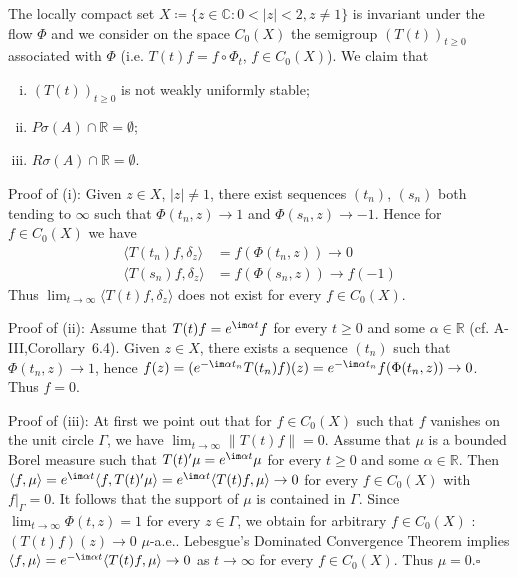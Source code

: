 \begin{example}
\begin{enumerate}[(a), wide, labelsep=1em, itemindent=\parindent]
The locally compact set $X \coloneq
 \{z \in \mathbb{C} \colon 0  <  |z|  <  2, z \neq 1\}$ is invariant under the flow $\Phi$ and we consider on the space $C_{0}(X)$ the semigroup $(T(t))_{t \geq 0}$ associated with $\Phi$ (i.e. $T(t)f = f\circ\Phi_t$, $f \in C_{0}(X)$). We claim that
\begin{enumerate}[(i)]
	\item
	$(T(t))_{t \geq 0}$ is not weakly uniformly stable;
	
	\item 
	$P\sigma(A)\cap\mathbb{R} = \emptyset$;
	
	\item 
	$R\sigma(A)\cap\mathbb{R} = \emptyset$.
\end{enumerate}

Proof of (i): Given $z \in X$, $|z| \neq 1$, there exist sequences $(t_n)$, $(s_n)$ both tending to $\infty$ such that $\Phi(t_n,z) \to 1$ and $\Phi(s_n,z) \to -1$. Hence for $f \in C_{0}(X)$ we have
\[
   \begin{aligned}
   \langle T(t_n)f,\delta_z \rangle &= f(\Phi(t_n,z)) \to 0\\
   \langle T(s_n)f,\delta_z \rangle &= f(\Phi(s_n,z)) \to f(-1)
   \end{aligned}
\]
Thus $\lim_{t\to\infty} \langle T(t)f,\delta_z \rangle$ does not exist for every $f \in C_{0}(X)$.

Proof of (ii): Assume that $T(t)f = e^{\im\alpha t}f$ for every $t \geq 0$ and some $\alpha \in \mathbb{R}$ (cf. A-III,Corollary~6.4). Given $z \in X$, there exists a sequence $(t_n)$ such that $\Phi(t_n,z) \to 1$, hence
%
%
%
%
\newpage
{}
$f(z) = (e^{-\im\alpha t_n}T(t_n)f)(z) = e^{-\im\alpha t_n}f(\Phi(t_n,z)) \to 0$. Thus $f = 0$.

Proof of (iii): At first we point out that for $f \in C_{0}(X)$ such that $f$ vanishes on the unit circle $\Gamma$, we have $\lim_{t\to\infty} \|T(t)f\| = 0$.
Assume that $\mu$ is a bounded Borel measure such that $T(t)'\mu = e^{\im\alpha t}\mu$ for every $t \geq 0$ and some $\alpha \in \mathbb{R}$. 
Then $\langle f,\mu \rangle = e^{\im\alpha t}\langle f,T(t)'\mu \rangle = e^{\im\alpha t}\langle T(t)f,\mu \rangle \to 0$ for every $f \in C_{0}(X)$ with $f|_\Gamma = 0$. 
It follows that the support of $\mu$ is contained in $\Gamma$. Since $\lim_{t\to\infty} \Phi(t,z) = 1$ for every $z \in \Gamma$, we obtain for arbitrary $f \in C_{0}(X)$ : $(T(t)f)(z) \to 0$ $\mu$-a.e.. Lebesgue's Dominated Convergence Theorem implies $\langle f,\mu \rangle = e^{-\im\alpha t}\langle T(t)f,\mu \rangle \to 0$ as $t \to \infty$ for every $f \in C_{0}(X)$. Thus $\mu = 0$.\hfill$\square$
\end{enumerate}
\end{example}

